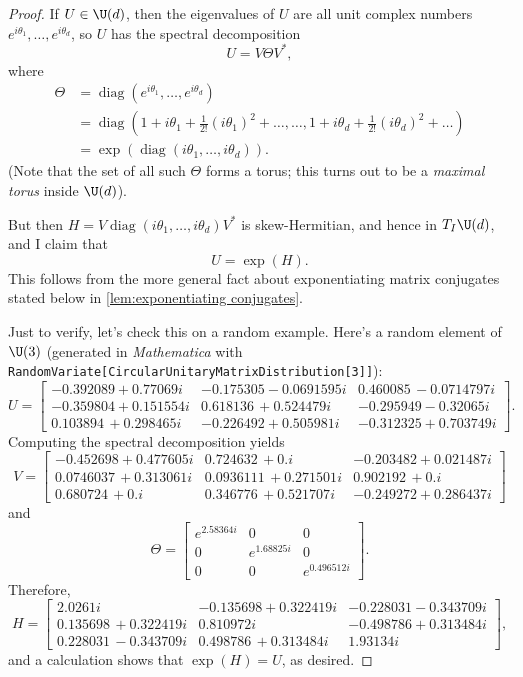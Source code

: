 \begin{proof}
	If $U \in \U(d)$, then the eigenvalues of $U$ are all unit complex numbers $e^{i \theta_1}, \dots , e^{i \theta_d}$, so $U$ has the spectral decomposition
	\[
		U = V \Theta V^\ast,
	\]
	where
	\begin{align*}
		\Theta & = \operatorname{diag}\left(e^{i \theta_1}, \dots , e^{i \theta_d}\right) \\
		& = \operatorname{diag}\left(1 + i \theta_1 + \frac{1}{2!} \left(i\theta_1\right)^2 + \dots , \dots , 1 + i \theta_d + \frac{1}{2!} \left(i\theta_d\right)^2 + \dots \right) \\
		& = \exp(\operatorname{diag}(i\theta_1, \dots , i \theta_d)).
	\end{align*}
	(Note that the set of all such $\Theta$ forms a torus; this turns out to be a \emph{maximal torus} inside $\U(d)$).

	But then $H = V \operatorname{diag}(i\theta_1, \dots , i \theta_d)V^\ast$ is skew-Hermitian, and hence in $T_I\U(d)$, and I claim that
	\[
		U = \exp(H).
	\]
	This follows from the more general fact about exponentiating matrix conjugates stated below in \cref{lem:exponentiating conjugates}.

	Just to verify, let's check this on a random example. Here's a random element of $\U(3)$ (generated in \emph{Mathematica} with {\tt RandomVariate[CircularUnitaryMatrixDistribution[3]]}):
	\[
		U = \begin{bmatrix} -0.392089+0.77069 i & -0.175305-0.0691595 i & 0.460085\, -0.0714797 i \\
 -0.359804+0.151554 i & 0.618136\, +0.524479 i & -0.295949-0.32065 i \\
 0.103894\, +0.298465 i & -0.226492+0.505981 i & -0.312325+0.703749 i \end{bmatrix}.
	\]
	Computing the spectral decomposition yields
	\[
		V = \begin{bmatrix} -0.452698+0.477605 i & 0.724632\, +0. i & -0.203482+0.021487 i \\
 0.0746037\, +0.313061 i & 0.0936111\, +0.271501 i & 0.902192\, +0. i \\
 0.680724\, +0. i & 0.346776\, +0.521707 i & -0.249272+0.286437 i \end{bmatrix}
 \]
 and
 \[
 	 \Theta = \begin{bmatrix} e^{2.58364 i} & 0 & 0 \\
 0 & e^{1.68825 i} & 0 \\
 0 & 0 & e^{0.496512 i} \end{bmatrix}.
	\]
	Therefore,
	\[
		H = \begin{bmatrix} 2.0261 i & -0.135698+0.322419 i & -0.228031-0.343709 i \\
 0.135698\, +0.322419 i & 0.810972 i & -0.498786+0.313484 i \\
 0.228031\, -0.343709 i & 0.498786\, +0.313484 i & 1.93134 i \end{bmatrix},
	\]
	and a calculation shows that $\exp(H) = U$, as desired.
\end{proof}

